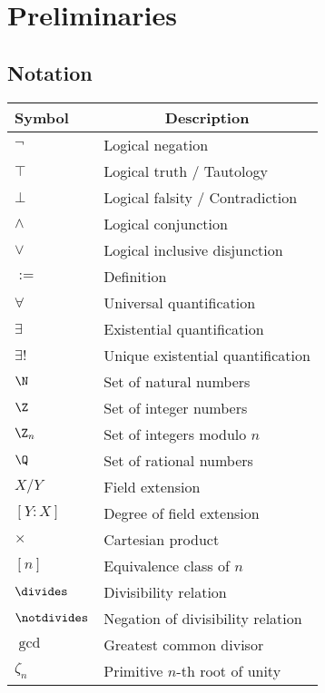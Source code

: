 \chapter{Preliminaries}

\section{Notation}

\begin{tabular}{>{\centering}m{1.8cm} m{5.8cm}}
\toprule
\textbf{Symbol} & \multicolumn{1}{c}{\textbf{Description}} \\
\midrule
$\lnot$ & Logical negation \\
$\top$  & Logical truth / Tautology \\
$\bot$  & Logical falsity / Contradiction \\
$\land$ & Logical conjunction \\
$\lor$ & Logical inclusive disjunction \\
$:=$   & Definition \\
$\forall$ & Universal quantification \\
$\exists$ & Existential quantification \\
$\exists!$ & Unique existential quantification \\
$\N$ & Set of natural numbers \\
$\Z$ & Set of integer numbers \\
$\Z_n$ & Set of integers modulo $n$ \\
$\Q$ & Set of rational numbers \\
$X/Y$ & Field extension \\
$[Y:X]$ & Degree of field extension \\
$\times$ & Cartesian product \\
$[n]$ & Equivalence class of $n$ \\
$\divides$ & Divisibility relation \\
$\notdivides$ & Negation of divisibility relation \\
$\gcd$ & Greatest common divisor \\
$\zeta_n$ & Primitive $n$-th root of unity \\
\bottomrule
\end{tabular}

